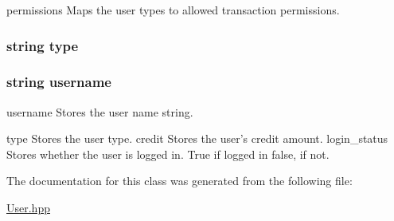permissions Maps the user types to allowed transaction permissions. 

\hypertarget{class_user_acce15679d830831b0bbe8ebc2a60b2ca}{
\subsubsection[{type}]{\setlength{\rightskip}{0pt plus 5cm}string type\hspace{0.3cm}{\ttfamily [private]}}}\label{class_user_acce15679d830831b0bbe8ebc2a60b2ca}
\hypertarget{class_user_aad02f271a6536fa078c6d1369ffdadc4}{
\subsubsection[{username}]{\setlength{\rightskip}{0pt plus 5cm}string username\hspace{0.3cm}{\ttfamily [private]}}}\label{class_user_aad02f271a6536fa078c6d1369ffdadc4}


username Stores the user name string. 

type Stores the user type. credit Stores the user's credit amount. login\-\_\-status Stores whether the user is logged in. True if logged in false, if not. 

The documentation for this class was generated from the following file\-:\begin{DoxyCompactItemize}
\item 
\hyperlink{_user_8hpp}{User.\-hpp}\end{DoxyCompactItemize}
